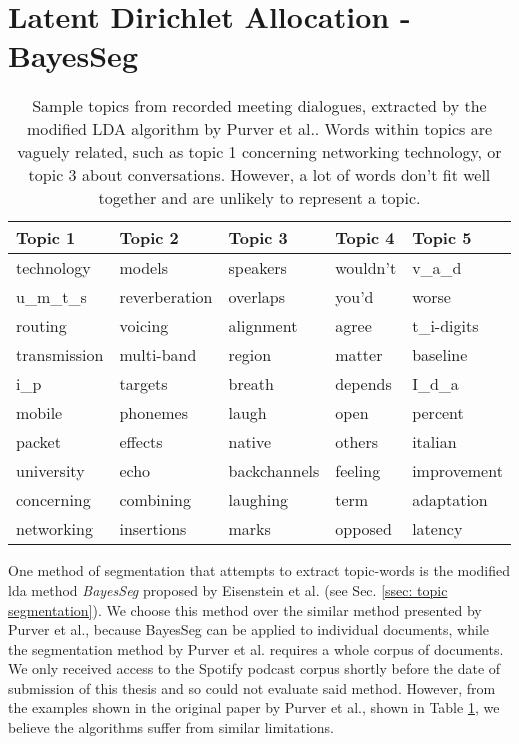 \section[LDA BayesSeg]{Latent Dirichlet Allocation - BayesSeg \label{method: LDA}}
    \begin{table}[]
    \centering
    \begin{tabular}{lllll}
    \hline
    \textbf{Topic 1}   & \textbf{Topic 2}    & \textbf{Topic 3}   & \textbf{Topic 4} & \textbf{Topic 5}  \\ \hline
    technology   & models        & speakers     & wouldn't   & v\_a\_d     \\
    u\_m\_t\_s   & reverberation & overlaps     & you'd      & worse       \\
    routing      & voicing       & alignment    & agree      & t\_i-digits \\
    transmission & multi-band    & region       & matter     & baseline    \\
    i\_p         & targets       & breath       & depends    & I\_d\_a     \\
    mobile       & phonemes      & laugh        & open       & percent     \\
    packet       & effects       & native       & others     & italian     \\
    university   & echo          & backchannels & feeling    & improvement \\
    concerning   & combining     & laughing     & term       & adaptation  \\
    networking   & insertions    & marks        & opposed    & latency     \\ \hline
    \end{tabular}
    \caption{Sample topics from recorded meeting dialogues, extracted by the modified \gls{LDA} algorithm by Purver et al.\cite{purver2006unsupervised}. Words within topics are vaguely related, such as topic 1 concerning networking technology, or topic 3 about conversations. However, a lot of words don't fit well together and are unlikely to represent a topic.}
    \label{table: modified lda topics}
    \end{table}

    One method of segmentation that attempts to extract topic-words is the modified \gls{lda} method \textit{BayesSeg} proposed by Eisenstein et al.\cite{eisenstein2008bayesian} (see Sec. \ref{ssec: topic segmentation}). We choose this method over the similar method presented by Purver et al.\cite{purver2006unsupervised}, because BayesSeg can be applied to individual documents, while the segmentation method by Purver et al. requires a whole corpus of documents. We only received access to the Spotify podcast corpus shortly before the date of submission of this thesis and so could not evaluate said method. However, from the examples shown in the original paper by Purver et al.\cite{purver2006unsupervised}, shown in Table \ref{table: modified lda topics}, we believe the algorithms suffer from similar limitations.

